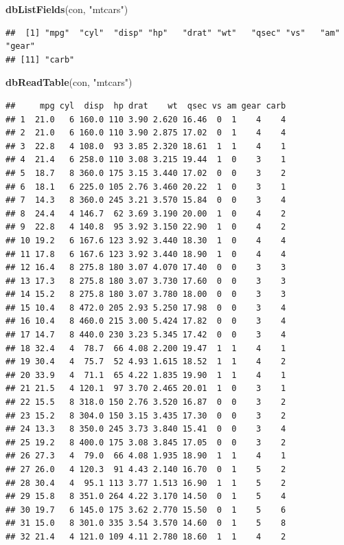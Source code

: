 \documentclass[
]{book}
\newenvironment{Shaded}{\begin{snugshade}}{\end{snugshade}}
\newcommand{\FunctionTok}[1]{\textcolor[rgb]{0.13,0.29,0.53}{\textbf{#1}}}
\newcommand{\NormalTok}[1]{#1}
\newcommand{\StringTok}[1]{\textcolor[rgb]{0.31,0.60,0.02}{#1}}
\begin{document}
\begin{Shaded}
\begin{Highlighting}[]
\FunctionTok{dbListFields}\NormalTok{(con, }\StringTok{"mtcars"}\NormalTok{)}
\end{Highlighting}
\end{Shaded}

\begin{verbatim}
##  [1] "mpg"  "cyl"  "disp" "hp"   "drat" "wt"   "qsec" "vs"   "am"   "gear"
## [11] "carb"
\end{verbatim}

\begin{Shaded}
\begin{Highlighting}[]
\FunctionTok{dbReadTable}\NormalTok{(con, }\StringTok{"mtcars"}\NormalTok{)}
\end{Highlighting}
\end{Shaded}

\begin{verbatim}
##     mpg cyl  disp  hp drat    wt  qsec vs am gear carb
## 1  21.0   6 160.0 110 3.90 2.620 16.46  0  1    4    4
## 2  21.0   6 160.0 110 3.90 2.875 17.02  0  1    4    4
## 3  22.8   4 108.0  93 3.85 2.320 18.61  1  1    4    1
## 4  21.4   6 258.0 110 3.08 3.215 19.44  1  0    3    1
## 5  18.7   8 360.0 175 3.15 3.440 17.02  0  0    3    2
## 6  18.1   6 225.0 105 2.76 3.460 20.22  1  0    3    1
## 7  14.3   8 360.0 245 3.21 3.570 15.84  0  0    3    4
## 8  24.4   4 146.7  62 3.69 3.190 20.00  1  0    4    2
## 9  22.8   4 140.8  95 3.92 3.150 22.90  1  0    4    2
## 10 19.2   6 167.6 123 3.92 3.440 18.30  1  0    4    4
## 11 17.8   6 167.6 123 3.92 3.440 18.90  1  0    4    4
## 12 16.4   8 275.8 180 3.07 4.070 17.40  0  0    3    3
## 13 17.3   8 275.8 180 3.07 3.730 17.60  0  0    3    3
## 14 15.2   8 275.8 180 3.07 3.780 18.00  0  0    3    3
## 15 10.4   8 472.0 205 2.93 5.250 17.98  0  0    3    4
## 16 10.4   8 460.0 215 3.00 5.424 17.82  0  0    3    4
## 17 14.7   8 440.0 230 3.23 5.345 17.42  0  0    3    4
## 18 32.4   4  78.7  66 4.08 2.200 19.47  1  1    4    1
## 19 30.4   4  75.7  52 4.93 1.615 18.52  1  1    4    2
## 20 33.9   4  71.1  65 4.22 1.835 19.90  1  1    4    1
## 21 21.5   4 120.1  97 3.70 2.465 20.01  1  0    3    1
## 22 15.5   8 318.0 150 2.76 3.520 16.87  0  0    3    2
## 23 15.2   8 304.0 150 3.15 3.435 17.30  0  0    3    2
## 24 13.3   8 350.0 245 3.73 3.840 15.41  0  0    3    4
## 25 19.2   8 400.0 175 3.08 3.845 17.05  0  0    3    2
## 26 27.3   4  79.0  66 4.08 1.935 18.90  1  1    4    1
## 27 26.0   4 120.3  91 4.43 2.140 16.70  0  1    5    2
## 28 30.4   4  95.1 113 3.77 1.513 16.90  1  1    5    2
## 29 15.8   8 351.0 264 4.22 3.170 14.50  0  1    5    4
## 30 19.7   6 145.0 175 3.62 2.770 15.50  0  1    5    6
## 31 15.0   8 301.0 335 3.54 3.570 14.60  0  1    5    8
## 32 21.4   4 121.0 109 4.11 2.780 18.60  1  1    4    2
\end{verbatim}
\end{document}
